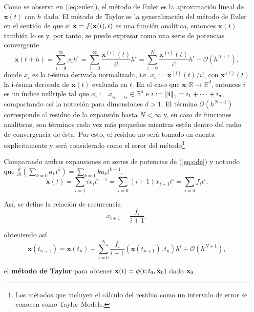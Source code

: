 Como se observa en (\ref{eq:euler}), el método de Euler es la aproximación lineal de $\mathbf{x}(t)$ con $h$ dado. El método de Taylor es la generalización del método de Euler en el sentido de que si $\dot{\mathbf{x}} = f(\mathbf{x}(t),t)$ es una función analítica, entonces $\mathbf{x}(t)$ también lo es y, por tanto, se puede expresar como una serie de potencias convergente 
\begin{equation}
\mathbf{x}(t + h) = \sum_{i=0}^\infty x_i h^i = \sum_{i=0}^\infty \frac{\mathbf{x}^{(i)}(t)}{i!}h^i 
= \sum_{i=0}^N \frac{\mathbf{x}^{(i)}(t)}{i!}h^i + \mathcal{O}(h^{N+1}),
\label{eq:anal-exp}
\end{equation}
donde $x_i$ es la i-ésima derivada normalizada, i.e. $x_i  := \mathbf{x}^{(i)}(t)/i! $, con $\mathbf{x}^{(i)}(t)$ la i-ésima derivada de $\mathbf{x}(t)$ evaluada en $t$. En el caso que $\mathbf{x}: \mathbb{R} \to \mathbb{R}^d$, entonces $i$ es un índice múltiple tal que $x_i := x_{i_1,\cdots,i_d} \in \mathbb{R}^d$ e $i :=\left\lVert\mathbf{i}\right\rVert_1 = i_1 + \cdots + i_d$, compactando así la notación para dimensiones $d > 1$. El término $\mathcal{O}(h^{N+1})$ corresponde al residuo de la expansión hasta $N < \infty$ y, en caso de funciones analíticas, son términos cada vez más pequeños mientras estén dentro del radio de convergencia de ésta. Por esto, el residuo no será tomado en cuenta explícitamente y será considerado como el error del método\footnote{Los métodos que incluyen el cálculo del residuo como un intervalo de error se conocen como Taylor Models.}

Comparando ambas expansiones en series de potencias de (\ref{eq:ode}) y notando que $ \frac{d}{dt} \left( \sum_{k=0} a_k t^k \right) = \sum_{k=1} k a_k t^{k-1}$,   
\begin{equation*}
 \dot{\mathbf{x}}(t) = \sum_{i=1} i x_i t^{i-1} = \sum_{i=0} (i+1)x_{i+1} t^i = \sum_{i=0} f_i t^i.
\end{equation*}

Así, se define la relación de recurrencia
\begin{equation}
x_{i+1} = \frac{f_i}{i+1},
\label{eq:rec-rel}
\end{equation}

obteniendo así 
\begin{equation}
\mathbf{x}(t_{n+1}) = \mathbf{x}(t_n) + \sum_{i=0}^N \frac{f_i}{i+1} \left(\mathbf{x}(t_{n+1}),t_n \right) h^i + \mathcal{O}(h^{N+1}),
\label{eq:taylor-rel}
\end{equation}

el \textbf{método de Taylor} para obtener $\mathbf{x}(t) = \phi(t;t_0,\mathbf{x}_0)$ dado $\mathbf{x}_0$.

